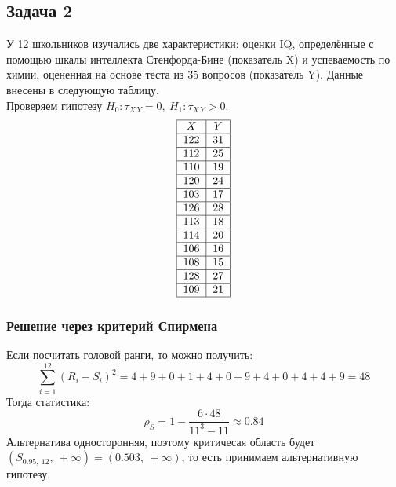 \documentclass[12pt, a4paper]{article}
\newcommand{\oo}{\infty}
\begin{document}
\subsection*{Задача 2}
У 12 школьников изучались две характеристики: оценки IQ, определённые с помощью шкалы интеллекта Стенфорда-Бине (показатель X) и успеваемость по химии, оцененная на основе теста из 35 вопросов (показатель Y). Данные внесены в следующую таблицу.\\
Проверяем гипотезу $H_0: \tau_{X\, Y} = 0,\ H_1: \tau_{X\, Y} > 0$.
\[\begin{tabular}{|c|c|}
    \hline
    $X$ & $Y$\\
    \hline
    122 & 31 \\
    \hline
    112 & 25 \\
    \hline
    110 & 19 \\
    \hline
    120 & 24 \\
    \hline
    103 & 17 \\
    \hline
    126 & 28\\
    \hline
    113 & 18 \\
    \hline
    114 & 20 \\
    \hline
    106 & 16 \\
    \hline
    108 & 15 \\
    \hline
    128 & 27 \\
    \hline
    109 & 21 \\
    \hline
\end{tabular}\]
\subsubsection*{Решение через критерий Спирмена}
Если посчитать головой ранги, то можно получить:
\[\sum_{i = 1}^{12} {\left( R_i - S_i \right)}^2 = 4 + 9 + 0 + 1 + 4 + 0 + 9 + 4 + 0 + 4 + 4 + 9 = 48\]
Тогда статистика:
\[\rho_S = 1 - \frac{6\cdot 48}{11^3 - 11} \approx 0.84\]
Альтернатива односторонняя, поэтому критичесая область будет $(S_{0.95,\ 12},\ +\oo) = (0.503,\ +\oo)$, то есть принимаем альтернативную гипотезу.
\end{document}
